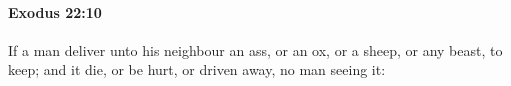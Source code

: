 
		\paragraph{Exodus 22:10} %
			\label{EXODUS-22-10}

			If a man deliver unto his neighbour an ass, or an ox, or a sheep, or any beast, to keep; and it die, or be hurt, or driven away, no man seeing it:


